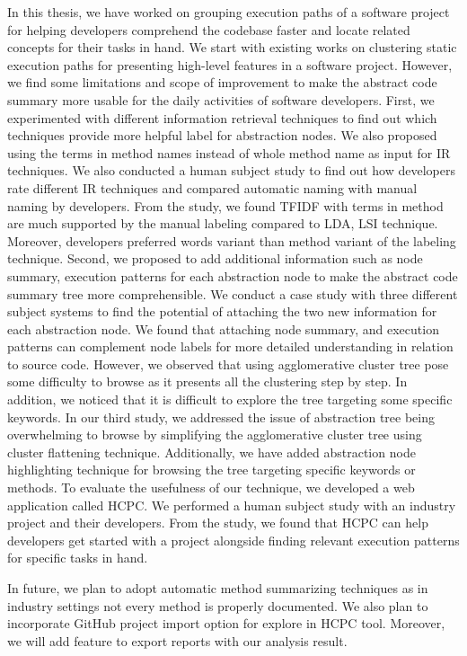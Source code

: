 \label{chapter:conclusion}
In this thesis, we have worked on grouping execution paths of a software project for helping developers comprehend the codebase faster and locate related concepts for their tasks in hand. We start with existing works on clustering static execution paths for presenting high-level features in a software project. However, we find some limitations and scope of improvement to make the abstract code summary more usable for the daily activities of software developers. First, we experimented with different information retrieval techniques to find out which techniques provide more helpful label for abstraction nodes. We also proposed using the terms in method names instead of whole method name as input for IR techniques. We also conducted a human subject study to find out how developers rate different IR techniques and compared automatic naming with manual naming by developers. From the study, we found TFIDF with terms in method are much supported by the manual labeling compared to LDA, LSI technique. Moreover, developers preferred words variant than method variant of the labeling technique. Second, we proposed to add additional information such as node summary, execution patterns for each abstraction node to make the abstract code summary tree more comprehensible. We conduct a case study with three different subject systems to find the potential of attaching the two new information for each abstraction node. We found that attaching node summary, and execution patterns can complement node labels for more detailed understanding in relation to source code. However, we observed that using agglomerative cluster tree pose some difficulty to browse as it presents all the clustering step by step. In addition, we noticed that it is difficult to explore the tree targeting some specific keywords. In our third study, we addressed the issue of abstraction tree being overwhelming to browse by simplifying the agglomerative cluster tree using cluster flattening technique. Additionally, we have added abstraction node highlighting technique for browsing the tree targeting specific keywords or methods. To evaluate the usefulness of our technique, we developed a web application called HCPC. We performed a human subject study with an industry project and their developers. From the study, we found that HCPC can help developers get started with a project alongside finding relevant execution patterns for specific tasks in hand.

In future, we plan to adopt automatic method summarizing techniques as in industry settings not every method is properly documented. We also plan to incorporate GitHub project import option for explore in HCPC tool. Moreover, we will add feature to export reports with our analysis result.
